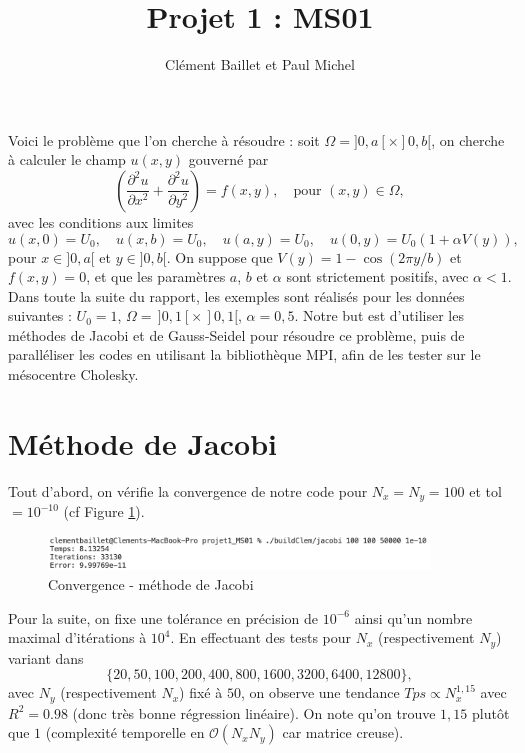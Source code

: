 \documentclass{article}
\title{Projet 1 : MS01}
\author{Clément Baillet et Paul Michel}
\date{}
\begin{document}
\maketitle

Voici le problème que l'on cherche à résoudre : soit $\Omega = ]0, a[ \times ]0, b[$, on cherche à calculer le champ $u(x,y)$ gouverné par
\begin{equation*}
    \left(\frac{\partial^2 u}{\partial x^2} + \frac{\partial^2 u}{\partial y^2}\right) = f(x,y), \quad \text{pour } (x,y) \in \Omega,
\end{equation*}
avec les conditions aux limites
\begin{equation*}
    u(x, 0) = U_0, \quad u(x, b) = U_0, \quad u(a, y) = U_0, \quad u(0, y) = U_0 (1 + \alpha V(y)),
\end{equation*}
pour $x \in ]0, a[$ et $y \in ]0, b[$. On suppose que $V(y) = 1 - \cos(2\pi y/b)$ et $f(x,y) = 0$, et que les paramètres $a$, $b$ et $\alpha$ sont strictement positifs, avec $\alpha < 1$. Dans toute la suite du rapport, les exemples sont réalisés pour les données suivantes : $U_0 = 1$, $\Omega = \,]0, 1[ \times \,]0, 1[$, $\alpha = 0,5$. Notre but est d'utiliser les méthodes de Jacobi et de Gauss-Seidel pour résoudre ce problème, puis de paralléliser les codes en utilisant la bibliothèque MPI, afin de les tester sur le mésocentre Cholesky.

\section{Méthode de Jacobi}

Tout d'abord, on vérifie la convergence de notre code pour $N_x = N_y = 100$ et tol$=10^{-10}$ (cf Figure \ref{fig:cvJacobi}).

\begin{figure}[H]
    \centering
    \includegraphics[width=0.9\textwidth]{cvJacobi}
    \caption{Convergence - méthode de Jacobi}
    \label{fig:cvJacobi}
\end{figure}

Pour la suite, on fixe une tolérance en précision de $10^{-6}$ ainsi qu'un nombre maximal d'itérations à $10^4$. En effectuant des tests  pour $N_x$ (respectivement $N_y$) variant dans
$$\{20,50,100,200,400,800,1600,3200,6400,12800\},$$ 
avec $N_y$ (respectivement $N_x$) fixé à $50$, on observe une tendance $Tps \propto N_x^{1,15}$ avec $R^2=0.98$ (donc très bonne régression linéaire). On note qu'on trouve $1,15$ plutôt que $1$ (complexité temporelle en $\mathcal O(N_xN_y)$ car matrice creuse).
\end{document}
